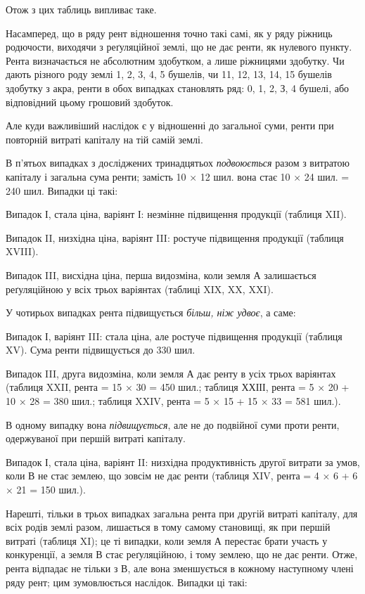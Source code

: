 

Отож з цих таблиць випливає таке.

Насамперед, що в ряду рент відношення точно такі самі, як у ряду ріжниць
родючости, виходячи з реґуляційної землі, що не дає ренти, як нулевого
пункту. Рента визначається не абсолютним здобутком, а лише ріжницями здобутку.
Чи дають різного роду землі 1, 2, 3, 4, 5 бушелів, чи 11, 12, 13, 14,
15 бушелів здобутку з акра, ренти в обох випадках становлять ряд: 0, 1, 2,
З, 4 бушелі, або відповідний цьому грошовий здобуток.

Але куди важливіший наслідок є у відношенні до загальної суми, ренти
при повторній витраті капіталу на тій самій землі.

В п’ятьох випадках з досліджених тринадцятьох \emph{подвоюється} разом з витратою
капіталу і загальна сума ренти; замість 10 × 12 шил. вона стає
10 × 24 шил. = 240 шил. Випадки ці такі:

Випадок І, стала ціна, варіянт І: незмінне підвищення продукції (таблиця
XII).

Випадок II, низхідна ціна, варіянт III: ростуче підвищення продукції
(таблиця XVIII).

Випадок III, висхідна ціна, перша видозміна, коли земля А залишається
реґуляційною у всіх трьох варіянтах (таблиці XIX, XX, XXI).

У чотирьох випадках рента підвищується \emph{більш, ніж удвоє}, а саме:

Випадок І, варіянт III: стала ціна, але ростуче підвищення продукції
(таблиця XV). Сума ренти підвищується до 330 шил.

Випадок III, друга видозміна, коли земля А дає ренту в усіх трьох варіянтах
(таблиця XXII, рента = 15 × 30 = 450 шил.; таблиця ХХІІІ, рента = 5 ×
20 + 10 × 28 = 380 шил.; таблиця XXIV, рента = 5 × 15 + 15 × 33   =
581   шил.).

В одному випадку вона \emph{підвищується}, але не до подвійної суми проти
ренти, одержуваної при першій витраті капіталу.

Випадок І, стала ціна, варіянт II: низхідна продуктивність другої витрати
за умов, коли В не стає землею, що зовсім не дає ренти (таблиця XIV, рента
= 4 × 6 + 6 × 21 = 150 шил.).

Нарешті, тільки в трьох випадках загальна рента при другій витраті
капіталу, для всіх родів землі разом, лишається в тому самому становищі, як при
першій витраті (таблиця XI); це ті випадки, коли земля А перестає брати участь
у конкуренції, а земля В стає реґуляційною, і тому землею, що не дає ренти.
Отже, рента відпадає не тільки з В, але вона зменшується в кожному наступному
члені ряду рент; цим зумовлюється наслідок. Випадки ці такі:

